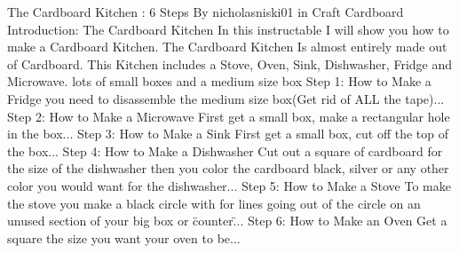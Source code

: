The Cardboard Kitchen : 6 Steps
By nicholasniski01 in Craft Cardboard
Introduction: The Cardboard Kitchen
In this instructable I will show you how to make a Cardboard Kitchen. The Cardboard Kitchen Is 
    almost entirely made out of Cardboard. This Kitchen includes a Stove, Oven, Sink, Dishwasher, 
    Fridge and Microwave.
lots of small boxes
and a medium size box
Step 1: How to Make a Fridge
    you need to disassemble the medium size box(Get rid of ALL the tape)...
Step 2: How to Make a Microwave
    First get a small box, make a rectangular hole in the box...
Step 3: How to Make a Sink
    First get a small box, cut off the top of the box...
Step 4: How to Make a Dishwasher
    Cut out a square of cardboard for the size of the dishwasher then you color the cardboard black, 
    silver or any other color you would want for the dishwasher...
Step 5: How to Make a Stove
    To make the stove you make a black circle with for lines going out of the circle on an unused 
    section of your big box or \"counter\"...
Step 6: How to Make an Oven
    Get a square the size you want your oven to be...
